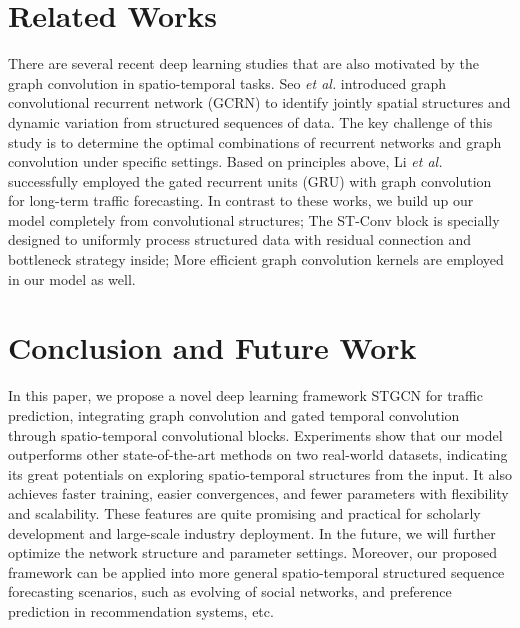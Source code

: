 \documentclass{article}
\begin{document}
\section{Related Works}
There are several recent deep learning studies that are also motivated by the graph convolution in spatio-temporal tasks. Seo \emph{et al.}  introduced graph convolutional recurrent network (GCRN) to identify jointly spatial structures and dynamic variation from structured sequences of data. The key challenge of this study is to determine the optimal combinations of recurrent networks and graph convolution under specific settings. Based on principles above, Li \emph{et al.}  successfully employed the gated recurrent units (GRU) with graph convolution for long-term traffic forecasting. In contrast to these works, we build up our model completely from convolutional structures; The ST-Conv block is specially designed to uniformly process structured data with residual connection and bottleneck strategy inside; More efficient graph convolution kernels are employed in our model as well.

\section{Conclusion and Future Work}
In this paper, we propose a novel deep learning framework STGCN for traffic prediction, integrating graph convolution and gated temporal convolution through spatio-temporal convolutional blocks. Experiments show that our model outperforms other state-of-the-art methods on two real-world datasets, indicating its great potentials on exploring spatio-temporal structures from the input. It also achieves faster training, easier convergences, and fewer parameters with flexibility and scalability. These features are quite promising and practical for scholarly development and large-scale industry deployment. In the future, we will further optimize the network structure and parameter settings. Moreover, our proposed framework can be applied into more general spatio-temporal structured sequence forecasting scenarios, such as evolving of social networks, and preference prediction in recommendation systems, etc.


\end{document}
